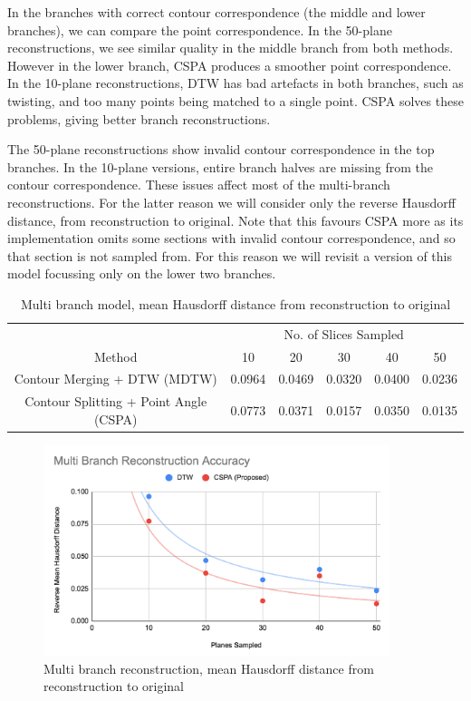 \documentclass[11p, titlepage]{article}
\begin{document}
In the branches with correct contour correspondence (the middle and lower branches), we can compare the point correspondence. In the 50-plane reconstructions, we see similar quality in the middle branch from both methods. However in the lower branch, CSPA produces a smoother point correspondence. In the 10-plane reconstructions, DTW has bad artefacts in both branches, such as twisting, and too many points being matched to a single point. CSPA solves these problems, giving better branch reconstructions.

The 50-plane reconstructions show invalid contour correspondence in the top branches. In the 10-plane versions, entire branch halves are missing from the contour correspondence. These issues affect most of the multi-branch reconstructions. For the latter reason we will consider only the reverse Hausdorff distance, from reconstruction to original. Note that this favours CSPA more as its implementation omits some sections with invalid contour correspondence, and so that section is not sampled from. For this reason we will revisit a version of this model focussing only on the lower two branches.

\begin{table}[h!]
\begin{tabular}{ | c | c | c | c | c | c | }
\hline
& \multicolumn{5}{c|}{No. of Slices Sampled} \\
\cline{2-6}
Method & 10 & 20 & 30 & 40 & 50 \\
\hline
Contour Merging + DTW (MDTW) & 0.0964 & 0.0469 & 0.0320 & 0.0400 & 0.0236 \\
Contour Splitting + Point Angle (CSPA) & 0.0773 & 0.0371 & 0.0157 & 0.0350 & 0.0135 \\
\hline
\end{tabular}
\caption{Multi branch model, mean Hausdorff distance from reconstruction to original}
\label{table:multi_branch_reverse}
\end{table}
\FloatBarrier

\begin{figure}[h!]
\centering
\includegraphics[width=0.9\textwidth]{graphs/multi-branch-reverse}
\caption{Multi branch reconstruction, mean Hausdorff distance from reconstruction to original\label{fig:multi_branch_reverse_graph}}
\end{figure}
\end{document}

